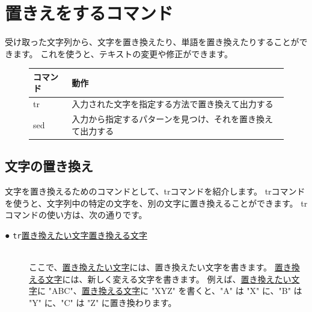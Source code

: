\documentclass[text03.tex]{subfiles}
\begin{document}
\begin{tcolorbox}[title=\useOmetoi]
    \begin{enumerate}
    \end{enumerate}
\end{tcolorbox}
\newpage
\section{置きえをするコマンド}
受け取った文字列から、文字を置き換えたり、単語を置き換えたりすることができます。
これを使うと、テキストの変更や修正ができます。

\begin{figure}[h]
    \begin{tabular}{ll}
    コマンド & 動作                                                       \\ \hline
    tr       & 入力された文字を指定する方法で置き換えて出力する           \\
    sed      & 入力から指定するパターンを見つけ、それを置き換えて出力する \\ \hline
    \end{tabular}
\end{figure}

\subsection{文字の置き換え}
文字を置き換えるためのコマンドとして、trコマンドを紹介します。
trコマンドを使うと、文字列中の特定の文字を、別の文字に置き換えることができます。
trコマンドの使い方は、次の通りです。


\begin{description}
    \item[● \texttt{tr}\textvisiblespace \underline{置き換えたい文字}\textvisiblespace \underline{置き換える文字}]\mbox{}\\
    ここで、\underline{置き換えたい文字}には、置き換えたい文字を書きます。
    \underline{置き換える文字}には、新しく変える文字を書きます。
    例えば、\underline{置き換えたい文字}に "ABC"、\underline{置き換える文字}に "XYZ" を書くと、"A" は "X" に、"B" は "Y" に、"C" は "Z"
    に置き換わります。
\end{description}
\end{document}

